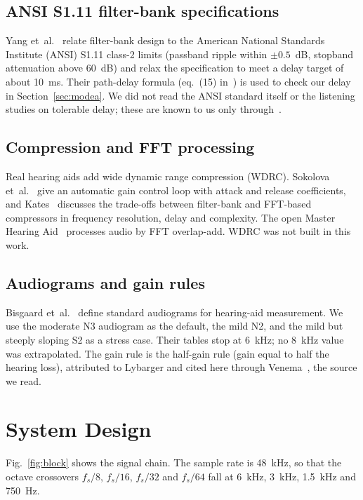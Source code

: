 \documentclass[conference]{IEEEtran}
\begin{document}
\subsection{ANSI S1.11 filter-bank specifications}
Yang et~al.~\cite{yang2016} relate filter-bank design to the American National Standards Institute (ANSI) S1.11 class-2 limits (passband ripple within $\pm0.5$~dB, stopband attenuation above 60~dB) and relax the specification to meet a delay target of about 10~ms. Their path-delay formula (eq.~(15) in~\cite{yang2016}) is used to check our delay in Section~\ref{sec:modea}. We did not read the ANSI standard itself or the listening studies on tolerable delay; these are known to us only through~\cite{yang2016,sokolova2021}.

\subsection{Compression and FFT processing}
Real hearing aids add wide dynamic range compression (WDRC). Sokolova et~al.~\cite{sokolova2022,garudadri2026patent} give an automatic gain control loop with attack and release coefficients, and Kates~\cite{kates2005} discusses the trade-offs between filter-bank and FFT-based compressors in frequency resolution, delay and complexity. The open Master Hearing Aid~\cite{kayser2022} processes audio by FFT overlap-add. WDRC was not built in this work.

\subsection{Audiograms and gain rules}
Bisgaard et~al.~\cite{bisgaard2010} define standard audiograms for hearing-aid measurement. We use the moderate N3 audiogram as the default, the mild N2, and the mild but steeply sloping S2 as a stress case. Their tables stop at 6~kHz; no 8~kHz value was extrapolated. The gain rule is the half-gain rule (gain equal to half the hearing loss), attributed to Lybarger and cited here through Venema~\cite{venema2001}, the source we read.

\section{System Design}\label{sec:design}
Fig.~\ref{fig:block} shows the signal chain. The sample rate is 48~kHz, so that the octave crossovers $f_s/8$, $f_s/16$, $f_s/32$ and $f_s/64$ fall at 6~kHz, 3~kHz, 1.5~kHz and 750~Hz.
\end{document}
